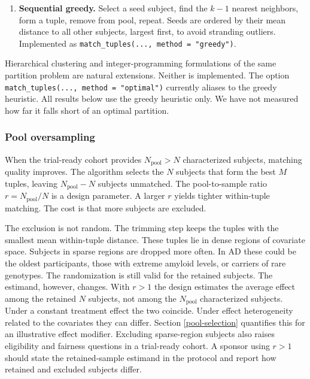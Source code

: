 \documentclass[
  11pt,
]{article}
\providecommand{\tightlist}{%
  \setlength{\itemsep}{0pt}\setlength{\parskip}{0pt}}
\begin{document}
\begin{enumerate}
\def\labelenumi{\arabic{enumi}.}
\tightlist
\item
  \textbf{Sequential greedy.} Select a seed subject, find the
  \(k-1\) nearest neighbors, form a tuple, remove from pool,
  repeat. Seeds are ordered by their mean distance to all
  other subjects, largest first, to avoid stranding
  outliers. Implemented as
  \texttt{match\_tuples(...,\ method\ =\ "greedy")}.
\end{enumerate}

Hierarchical clustering and integer-programming formulations
of the same partition problem are natural extensions.
Neither is implemented. The option
\texttt{match\_tuples(...,\ method\ =\ "optimal")} currently aliases to
the greedy heuristic. All results below use the greedy
heuristic only. We have not measured how far it falls short
of an optimal partition.

\subsubsection{Pool oversampling}\label{pool-oversampling}

When the trial-ready cohort provides \(N_{\text{pool}} > N\)
characterized subjects, matching quality improves. The
algorithm selects the \(N\) subjects that form the best \(M\)
tuples, leaving \(N_{\text{pool}} - N\) subjects unmatched. The
pool-to-sample ratio \(r = N_{\text{pool}} / N\) is a design
parameter. A larger \(r\) yields tighter within-tuple matching.
The cost is that more subjects are excluded.

The exclusion is not random. The trimming step keeps the
tuples with the smallest mean within-tuple distance. These
tuples lie in dense regions of covariate space. Subjects in
sparse regions are dropped more often. In AD these could be
the oldest participants, those with extreme amyloid levels,
or carriers of rare genotypes. The randomization is still
valid for the retained subjects. The estimand, however,
changes. With \(r > 1\) the design estimates the average
effect among the retained \(N\) subjects, not among the
\(N_{\text{pool}}\) characterized subjects. Under a constant
treatment effect the two coincide. Under effect
heterogeneity related to the covariates they can differ.
Section \ref{pool-selection} quantifies this for an
illustrative effect modifier. Excluding sparse-region
subjects also raises eligibility and fairness questions in
a trial-ready cohort. A sponsor using \(r > 1\) should state
the retained-sample estimand in the protocol and report how
retained and excluded subjects differ.
\end{document}
